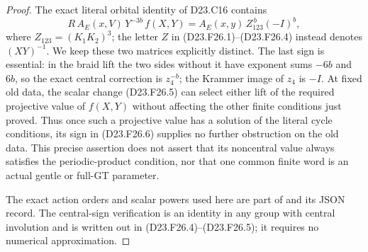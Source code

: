 \begin{proof}
The exact literal orbital identity of D23.C16 contains
\[
 R\,A_E(x,V)\,Y^{-3b}\,f(X,Y)
       =A_E(x,y)\,Z_{123}^{\,b}(-I)^b,
\tag{D23.F26.6}
\]
where $Z_{123}=(K_1K_2)^3$; the letter $Z$ in
(D23.F26.1)--(D23.F26.4) instead denotes $(XY)^{-1}$.
We keep these two matrices explicitly distinct.
The last sign is essential: in the braid lift the two sides
without it have exponent sums $-6b$ and $6b$, so the exact
central correction is $z_4^{-b}$; the Krammer image of $z_4$
is $-I$.  At fixed old data, the scalar change (D23.F26.5)
can select either lift of the required projective value of
$f(X,Y)$ without affecting the other finite conditions just
proved.  Thus once such a projective value has a solution of
the literal cycle conditions, its sign in (D23.F26.6) supplies
no further obstruction on the old data.  This precise assertion
does not assert that its noncentral value always satisfies
the periodic-product condition, nor that one common finite
word is an actual gentle or full-GT parameter.

The exact action orders and scalar powers used here are part
of  and
its JSON record.  The central-sign verification is an identity
in any group with central involution and is written out in
(D23.F26.4)--(D23.F26.5); it requires no numerical approximation.
\end{proof}
